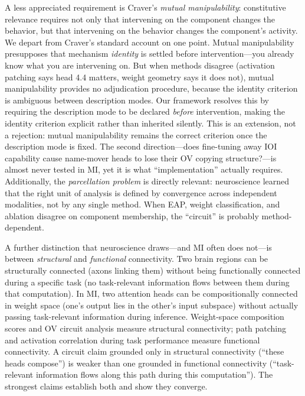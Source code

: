 \documentclass{article}
\begin{document}
A less appreciated requirement is Craver's \emph{mutual manipulability}: constitutive relevance requires not only that intervening on the component changes the behavior, but that intervening on the behavior changes the component's activity. We depart from Craver's standard account on one point. Mutual manipulability presupposes that mechanism \emph{identity} is settled before intervention---you already know what you are intervening on. But when methods disagree (activation patching says head 4.4 matters, weight geometry says it does not), mutual manipulability provides no adjudication procedure, because the identity criterion is ambiguous between description modes. Our framework resolves this by requiring the description mode to be declared \emph{before} intervention, making the identity criterion explicit rather than inherited silently. This is an extension, not a rejection: mutual manipulability remains the correct criterion once the description mode is fixed. The second direction---does fine-tuning away IOI capability cause name-mover heads to lose their OV copying structure?---is almost never tested in MI, yet it is what ``implementation'' actually requires. Additionally, the \emph{parcellation problem} is directly relevant: neuroscience learned that the right unit of analysis is defined by convergence across independent modalities, not by any single method. When EAP, weight classification, and ablation disagree on component membership, the ``circuit'' is probably method-dependent.

A further distinction that neuroscience draws---and MI often does not---is between \emph{structural} and \emph{functional} connectivity. Two brain regions can be structurally connected (axons linking them) without being functionally connected during a specific task (no task-relevant information flows between them during that computation). In MI, two attention heads can be compositionally connected in weight space (one's output lies in the other's input subspace) without actually passing task-relevant information during inference. Weight-space composition scores and OV circuit analysis measure structural connectivity; path patching and activation correlation during task performance measure functional connectivity. A circuit claim grounded only in structural connectivity (``these heads compose'') is weaker than one grounded in functional connectivity (``task-relevant information flows along this path during this computation''). The strongest claims establish both and show they converge.
\end{document}
